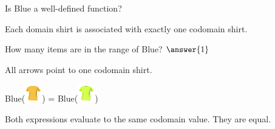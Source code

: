 \documentclass{ximera}
\begin{document}
\begin{exercise}
Is Blue a well-defined function?
  \begin{multipleChoice}
  \end{multipleChoice}
  \begin{feedback}
Each domain shirt is associated with exactly one codomain shirt.
  \end{feedback}
\end{exercise}





\begin{exercise}
How many items are in the range of Blue? $\answer{1}$
  \begin{feedback}
All arrows point to one codomain shirt.
  \end{feedback}
\end{exercise}







\begin{exercise}
 Blue({\includegraphics[width=28px,height=28px]{pics/elements/shirts/shirts2.png}}) = Blue({\includegraphics[width=28px,height=29px]{pics/elements/shirts/shirts4.png}}) 
  \begin{multipleChoice}
  \end{multipleChoice}
  \begin{feedback}
Both expressions evaluate to the same codomain value.  They are equal.
  \end{feedback}
\end{exercise}
\end{document}
